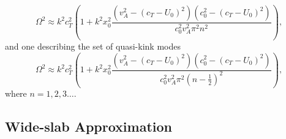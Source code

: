\begin{equation}
\label{disprelslabthinsausbody}
\Omega^2
\approx k^2 c_T^2
\left(1 + k^2 x_0^2 \dfrac{(v_A^2 - (c_T - U_0)^2 )(c_0^2 - (c_T - U_0)^2)}
{c_0^2 v_A^2 \pi^2 n^2} \right),
\end{equation}
and one describing the set of quasi-kink modes
\begin{equation}
\label{disprelslabthinkinkbody}
\Omega^2
\approx k^2 c_T^2
\left( 1 + k^2 x_0^2 \dfrac{(v_A^2 - (c_T - U_0)^2 )(c_0^2 - (c_T - U_0)^2)}
{c_0^2 v_A^2 \pi^2 (n- \frac{1}{2})^2} \right),
\end{equation}
where $n = 1, 2, 3 \dots$.



\subsection{Wide-slab Approximation}
\label{subsec:wide}

